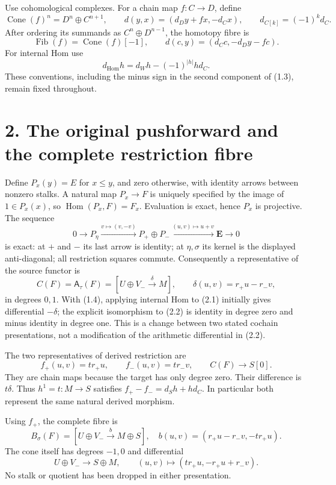 \documentclass[10pt,a4paper,oneside]{report}
\begin{document}
Use cohomological complexes. For a chain map \(f:C\to D\), define \[
\operatorname{Cone}(f)^n=D^n\oplus C^{n+1},\qquad
d(y,x)=(d_Dy+fx,-d_Cx),\qquad
d_{C[k]}=(-1)^k d_C.
\tag{1.2}
\] After ordering its summands as \(C^n\oplus D^{n-1}\), the homotopy
fibre is \[
\operatorname{Fib}(f)=\operatorname{Cone}(f)[-1],\qquad
d(c,y)=(d_Cc,-d_Dy-fc).
\tag{1.3}
\] For internal Hom use \[
d_{\operatorname{Hom}}h=d_Wh-(-1)^{|h|}h d_C.
\tag{1.4}
\] These conventions, including the minus sign in the second component
of (1.3), remain fixed throughout.

\section{2. The original pushforward and the complete restriction
fibre}\label{proof02:the-original-pushforward-and-the-complete-restriction-fibre}

Define \(P_x(y)=E\) for \(x\le y\), and zero otherwise, with identity
arrows between nonzero stalks. A natural map \(P_x\to F\) is uniquely
specified by the image of \(1\in P_x(x)\), so
\(\operatorname{Hom}(P_x,F)=F_x\). Evaluation is exact, hence \(P_x\) is
projective. The sequence \[
0\longrightarrow P_\eta
\xrightarrow{v\mapsto(v,-v)}P_+\oplus P_-
\xrightarrow{(u,v)\mapsto u+v}\mathbf E\longrightarrow0
\tag{2.1}
\] is exact: at \(+\) and \(-\) its last arrow is identity; at
\(\eta,\sigma\) its kernel is the displayed anti-diagonal; all
restriction squares commute. Consequently a representative of the source
functor is \[
C(F)=\mathsf A_\tau(F)
=[U\oplus V_-\xrightarrow{\delta}M],\qquad
\delta(u,v)=r_+u-r_-v,
\tag{2.2}
\] in degrees \(0,1\). With (1.4), applying internal Hom to (2.1)
initially gives differential \(-\delta\); the explicit isomorphism to
(2.2) is identity in degree zero and minus identity in degree one. This
is a change between two stated cochain presentations, not a modification
of the arithmetic differential in (2.2).

The two representatives of derived restriction are \[
f_+(u,v)=tr_+u,\qquad f_-(u,v)=tr_-v,
\qquad C(F)\longrightarrow S[0].
\tag{2.3}
\] They are chain maps because the target has only degree zero. Their
difference is \(t\delta\). Thus \(h^1=t:M\to S\) satisfies
\(f_+-f_-=d_Sh+h d_C\). In particular both represent the same natural
derived morphism.

Using \(f_+\), the complete fibre is \[
\boxed{B_\sigma(F)=
[U\oplus V_-\xrightarrow{b}M\oplus S],\quad
b(u,v)=(r_+u-r_-v,-tr_+u).}
\tag{2.4}
\] The cone itself has degrees \(-1,0\) and differential \[
U\oplus V_-\longrightarrow S\oplus M,
\qquad (u,v)\longmapsto(tr_+u,-r_+u+r_-v).
\tag{2.5}
\] No stalk or quotient has been dropped in either presentation.
\end{document}
